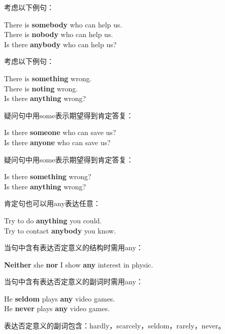 \documentclass[UTF8]{ctexart}
\newcommand{\littf}[1]{{\hspace{3pt}\ttfamily #1}}
\begin{document}
    考虑以下例句：
    \begin{center}
        \ttfamily\large
        There is \textbf{somebody} who can help us.\\[3mm]
        There is \textbf{nobody} who can help us.\\[3mm]
        Is there \textbf{anybody} who can help us?\\[6mm]
    \end{center}
    考虑以下例句：
    \begin{center}
        \ttfamily\large
        There is \textbf{something} wrong.\\[3mm]
        There is \textbf{noting} wrong.\\[3mm]
        Is there \textbf{anything} wrong?\\[6mm]
    \end{center}
    疑问句中用\littf{some}表示期望得到肯定答复：
    \begin{center}
        \ttfamily\large
        Is there \textbf{someone} who can save us?\\[3mm]
        Is there \textbf{anyone} who can save us?\\[6mm]
    \end{center}
    疑问句中用\littf{some}表示期望得到肯定答复：
    \begin{center}
        \ttfamily\large
        Is there \textbf{something} wrong?\\[3mm]
        Is there \textbf{anything} wrong?\\[6mm]
    \end{center}
    肯定句也可以用\littf{any}表达任意：
    \begin{center}
        \ttfamily\large
        Try to do \textbf{anything} you could.\\[3mm]
        Try to contact \textbf{anybody} you know.\\[6mm]
    \end{center}
    当句中含有表达否定意义的结构时需用\littf{any}：
    \begin{center}
        \ttfamily\large
        \textbf{Neither} she \textbf{nor} I show \textbf{any} interest in physic.\\[6mm]
    \end{center}
    当句中含有表达否定意义的副词时需用\littf{any}：
    \begin{center}
        \ttfamily\large
        He \textbf{seldom} plays \textbf{any} video games.\\[3mm]
        He \textbf{never} plays \textbf{any} video games.\\[6mm]
    \end{center}
    表达否定意义的副词包含：\littf{hardly}，\littf{scarcely}，\littf{seldom}，\littf{rarely}，\littf{never}。
\end{document}
